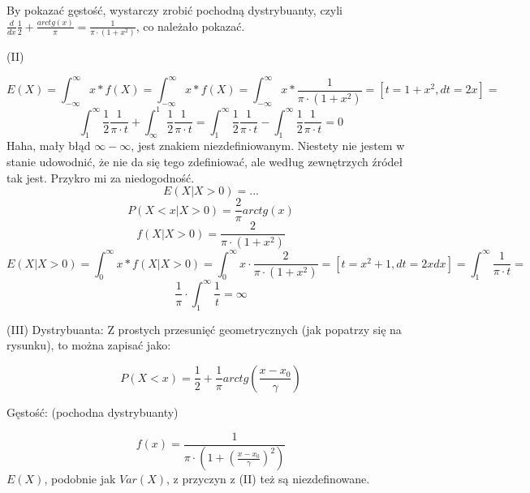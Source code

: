 By pokazać gęstość, wystarczy zrobić pochodną dystrybuanty, czyli  \(\frac{d}{dx}\frac{1}{2} + \frac{arctg(x)}{\pi} = \frac{1}{\pi \cdot (1+x^2)}\), co należało pokazać.

(II)

\[
	E(X) = \int_{-\infty}^{\infty} x * f(X) = \int_{-\infty}^{\infty} x * f(X) = \int_{-\infty}^{\infty} x * \frac{1}{\pi \cdot (1+x^2)} = [t = 1+x^2, dt = 2x] =
\]
\[
	\int_{1}^{\infty} \frac{1}{2} \frac{1}{\pi \cdot t} + \int_{\infty}^{1} \frac{1}{2} \frac{1}{\pi \cdot t} = \int_{1}^{\infty} \frac{1}{2} \frac{1}{\pi \cdot t} - \int_{1}^{\infty} \frac{1}{2} \frac{1}{\pi \cdot t} = 0
\]
Haha, mały błąd \(\infty - \infty\), jest znakiem niezdefiniowanym. Niestety nie jestem w stanie udowodnić, że nie da się tego zdefiniować, ale według zewnętrzych źródeł tak jest. Przykro mi za niedogodność.
\[
	E(X | X > 0) = ...
\]
\[
	P(X < x | X > 0) = \frac{2}{\pi} arctg(x)
\]
\[
	f(X | X > 0) =  \frac{2}{\pi \cdot (1+x^2)}
\]
\[
	E(X | X > 0) = \int_{0}^{\infty} x * f(X | X > 0) = \int_{0}^{\infty} x \cdot \frac{2}{\pi \cdot (1+x^2)} = [t = x^2+1, dt = 2x dx] = \int_{1}^{\infty} \frac{1}{\pi \cdot t} =
\]
\[
	\frac{1}{\pi} \cdot \int_{1}^{\infty} \frac{1}{t} = \infty
\]

(III) Dystrybuanta:
Z prostych przesunięć geometrycznych (jak popatrzy się na rysunku), to można zapisać jako:

\[
	P(X < x) = \frac{1}{2} + \frac{1}{\pi} arctg(\frac{x - x_0}{\gamma})
\]

Gęstość: (pochodna dystrybuanty)

\[
	f(x) =  \frac{1}{\pi \cdot (1+(\frac{x-x_0}{\gamma})^2)}
\]
\(E(X)\), podobnie jak \(Var(X)\), z przyczyn z (II) też są niezdefinowane.

